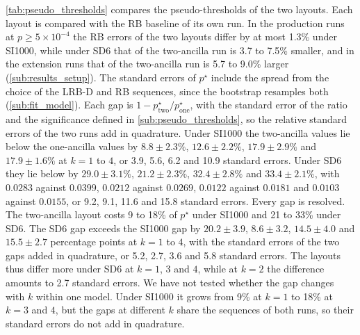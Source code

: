 \autoref{tab:pseudo_thresholds} compares the pseudo-thresholds of the two layouts. Each layout is compared with the RB baseline of its own run. In the production runs at $p \ge 5\times10^{-4}$ the RB errors of the two layouts differ by at most 1.3\% under SI1000, while under SD6 that of the two-ancilla run is 3.7 to 7.5\% smaller, and in the extension runs that of the two-ancilla run is 5.7 to 9.0\% larger (\autoref{sub:results_setup}). The standard errors of $p^\star$ include the spread from the choice of the LRB-D and RB sequences, since the bootstrap resamples both (\autoref{sub:fit_model}). Each gap is $1 - p^\star_{\mathrm{two}}/p^\star_{\mathrm{one}}$, with the standard error of the ratio and the significance defined in \autoref{sub:pseudo_thresholds}, so the relative standard errors of the two runs add in quadrature.
Under SI1000 the two-ancilla values lie below the one-ancilla values by $8.8 \pm 2.3\%$, $12.6 \pm 2.2\%$, $17.9 \pm 2.9\%$ and $17.9 \pm 1.6\%$ at $k = 1$ to $4$, or 3.9, 5.6, 6.2 and 10.9 standard errors.
Under SD6 they lie below by $29.0 \pm 3.1\%$, $21.2 \pm 2.3\%$, $32.4 \pm 2.8\%$ and $33.4 \pm 2.1\%$, with $0.0283$ against $0.0399$, $0.0212$ against $0.0269$, $0.0122$ against $0.0181$ and $0.0103$ against $0.0155$, or 9.2, 9.1, 11.6 and 15.8 standard errors.
Every gap is resolved. The two-ancilla layout costs 9 to 18\% of $p^\star$ under SI1000 and 21 to 33\% under SD6. The SD6 gap exceeds the SI1000 gap by $20.2 \pm 3.9$, $8.6 \pm 3.2$, $14.5 \pm 4.0$ and $15.5 \pm 2.7$ percentage points at $k = 1$ to $4$, with the standard errors of the two gaps added in quadrature, or 5.2, 2.7, 3.6 and 5.8 standard errors. The layouts thus differ more under SD6 at $k = 1$, $3$ and $4$, while at $k = 2$ the difference amounts to 2.7 standard errors. We have not tested whether the gap changes with $k$ within one model. Under SI1000 it grows from 9\% at $k = 1$ to 18\% at $k = 3$ and $4$, but the gaps at different $k$ share the sequences of both runs, so their standard errors do not add in quadrature.

